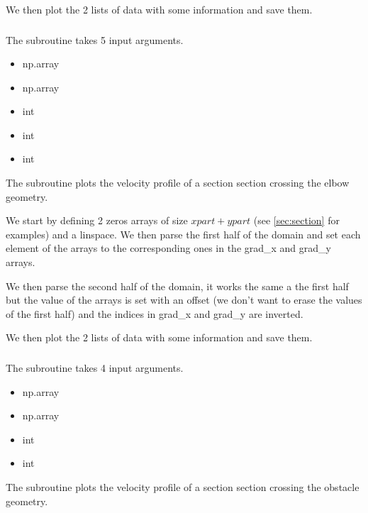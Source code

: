 We then plot the 2 lists of data with some information and save them.

\subsubsection{}
The subroutine \textcolor{func}{} takes 5 input arguments.
\begin{itemize}
      \item {} \textcolor{dtype}{np.array}
      \item {} \textcolor{dtype}{np.array}
      \item {} \textcolor{dtype}{int}
      \item {} \textcolor{dtype}{int}
      \item {} \textcolor{dtype}{int}
\end{itemize}
The subroutine plots the velocity profile of a section section crossing the elbow
geometry.

We start by defining 2 zeros arrays of size $xpart + ypart$ (see
\autoref{sec:section} for examples) and a linspace. We then parse the first
half of the domain and set each element of the arrays to the corresponding ones
in the grad\_x and grad\_y arrays.

We then parse the second half of the domain, it works the same a the first half
but the value of the arrays is set with an offset (we don't want to erase the
values of the first half) and the indices in grad\_x and grad\_y are
inverted.

We then plot the 2 lists of data with some information and save them.

\subsubsection{}
The subroutine \textcolor{func}{} takes 4 input arguments.
\begin{itemize}
      \item {} \textcolor{dtype}{np.array}
      \item {} \textcolor{dtype}{np.array}
      \item {} \textcolor{dtype}{int}
      \item {} \textcolor{dtype}{int}
\end{itemize}
The subroutine plots the velocity profile of a section section crossing the
obstacle geometry.

